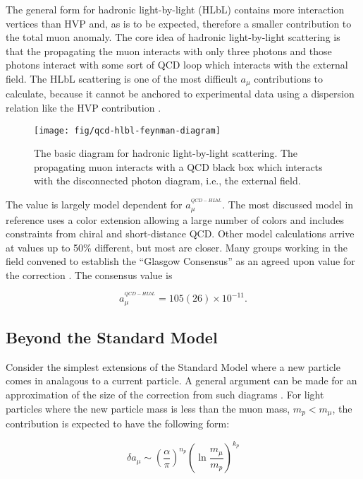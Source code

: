 The general form for hadronic light-by-light (HLbL) contains more interaction vertices than HVP and, as is to be expected, therefore a smaller contribution to the total muon anomaly.  The core idea of hadronic light-by-light scattering is that the propagating the muon interacts with only three photons and those photons interact with some sort of QCD loop which interacts with the external field.  The HLbL scattering is one of the most difficult $a_\mu$ contributions to calculate, because it cannot be anchored to experimental data using a dispersion relation like the HVP contribution \cite{the-muon-g-2}.

\begin{figure}
\centering
\texttt{[image: fig/qcd-hlbl-feynman-diagram]}
\caption{The basic diagram for hadronic light-by-light scattering.  The propagating muon interacts with a QCD black box which interacts with the disconnected photon diagram, i.e., the external field. \label{fig:qcd-hlbl-feynman-diagram}}
\end{figure}

The value is largely model dependent for $a_\mu^{^{QCD-HLbL}}$.  The most discussed model in reference \cite{amm-of-muon} uses a color extension allowing a large number of colors and includes constraints from chiral and short-distance QCD.  Other model calculations arrive at values up to 50\% different, but most are closer.  Many groups working in the field convened to establish the ``Glasgow Consensus'' as an agreed upon value for the correction \cite{e989-tdr}.  The consensus value is

\begin{equation}
\label{eqn:qcd-hlbl-total}
a_\mu^{^{QCD-HLbL}} = 105(26) \times 10^{-11}.
\end{equation}

\subsection{Beyond the Standard Model}

Consider the simplest extensions of the Standard Model where a new particle comes in analagous to a current particle.  A general argument can be made for an approximation of the size of the correction from such diagrams \cite{the-muon-g-2}.  For light particles where the new particle mass is less than the muon mass, $m_p < m_\mu$, the contribution is expected to have the following form:

\begin{equation}
\label{eqn:bsm-general-small-m}
\delta a_\mu \sim \left(\frac{\alpha}{\pi}\right)^{n_p} \left( \ln{\frac{m_\mu}{m_p}} \right)^{k_p}
\end{equation}

